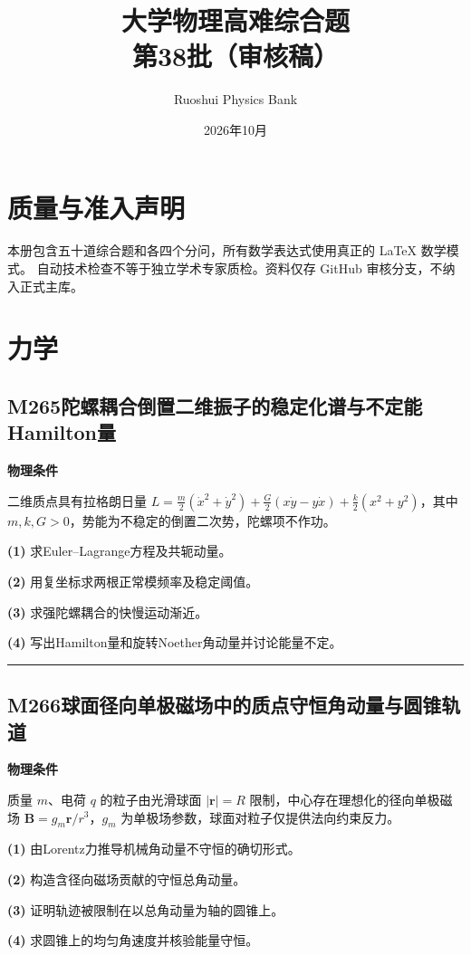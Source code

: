 \documentclass[UTF8,a4paper,11pt,oneside,openany]{ctexbook}
\begin{document}
\title{\textcolor{accent}{大学物理高难综合题}\\\Large 第38批（审核稿）}
\author{Ruoshui Physics Bank}
\date{2026年10月}
\maketitle
\tableofcontents
\chapter*{质量与准入声明}
本册包含五十道综合题和各四个分问，所有数学表达式使用真正的 \LaTeX{} 数学模式。
自动技术检查不等于独立学术专家质检。资料仅存 GitHub 审核分支，不纳入正式主库。

\chapter{力学}
\section*{M265\quad 陀螺耦合倒置二维振子的稳定化谱与不定能Hamilton量}
\textbf{物理条件}\par 二维质点具有拉格朗日量 \(L=\tfrac m2(\dot x^2+\dot y^2)+\tfrac G2(x\dot y-y\dot x)+\tfrac k2(x^2+y^2)\)，其中 \(m,k,G>0\)，势能为不稳定的倒置二次势，陀螺项不作功。
\par\noindent\textbf{(1)} 求Euler–Lagrange方程及共轭动量。
\par\noindent\textbf{(2)} 用复坐标求两根正常模频率及稳定阈值。
\par\noindent\textbf{(3)} 求强陀螺耦合的快慢运动渐近。
\par\noindent\textbf{(4)} 写出Hamilton量和旋转Noether角动量并讨论能量不定。

\par\bigskip\hrule\bigskip
\section*{M266\quad 球面径向单极磁场中的质点守恒角动量与圆锥轨道}
\textbf{物理条件}\par 质量 \(m\)、电荷 \(q\) 的粒子由光滑球面 \(|\boldsymbol r|=R\) 限制，中心存在理想化的径向单极磁场 \(\boldsymbol B=g_m\boldsymbol r/r^3\)，\(g_m\) 为单极场参数，球面对粒子仅提供法向约束反力。
\par\noindent\textbf{(1)} 由Lorentz力推导机械角动量不守恒的确切形式。
\par\noindent\textbf{(2)} 构造含径向磁场贡献的守恒总角动量。
\par\noindent\textbf{(3)} 证明轨迹被限制在以总角动量为轴的圆锥上。
\par\noindent\textbf{(4)} 求圆锥上的均匀角速度并核验能量守恒。
\end{document}
